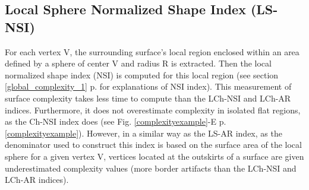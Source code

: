 \subsection{Local Sphere Normalized Shape Index (LS-NSI)}
For each vertex V, the surrounding surface's local region enclosed within an area defined by a sphere of center V and radius R is extracted. Then the local normalized shape index (NSI) is computed  for this  local region (see section \ref{global_complexity_1} p.\pageref{global_complexity_1} for explanations of NSI index). This measurement of surface complexity takes less time to compute than the LCh-NSI and LCh-AR indices. Furthermore, it does not overestimate complexity in isolated flat regions, as the Ch-NSI index does (see Fig. \ref{complexityexample}-E p.\ref{complexityexample}). However, in a similar way as the LS-AR index, as the denominator used to construct this index is based on the surface area of the local sphere for a given vertex V, vertices located at the outskirts of a surface are given underestimated complexity values (more border artifacts than the LCh-NSI and LCh-AR indices).



